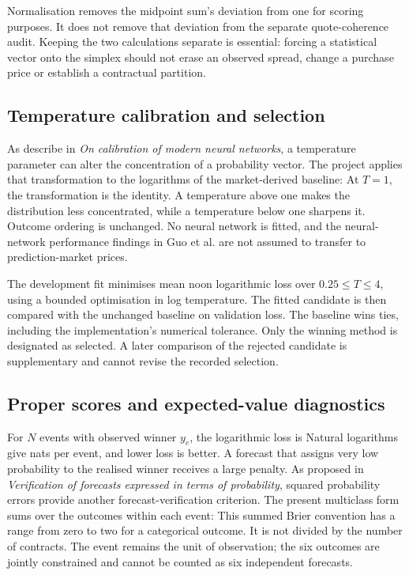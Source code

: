 Normalisation removes the midpoint sum's deviation from one for scoring purposes. It does not remove that deviation from the separate quote-coherence audit. Keeping the two calculations separate is essential: forcing a statistical vector onto the simplex should not erase an observed spread, change a purchase price or establish a contractual partition.

\subsection{Temperature calibration and selection}
As  describe in \textit{On calibration of modern neural networks}, a temperature parameter can alter the concentration of a probability vector. The project applies that transformation to the logarithms of the market-derived baseline:
At $T=1$, the transformation is the identity. A temperature above one makes the distribution less concentrated, while a temperature below one sharpens it. Outcome ordering is unchanged. No neural network is fitted, and the neural-network performance findings in Guo et al. are not assumed to transfer to prediction-market prices.

The development fit minimises mean noon logarithmic loss over $0.25\leq T\leq4$, using a bounded optimisation in log temperature. The fitted candidate is then compared with the unchanged baseline on validation loss. The baseline wins ties, including the implementation's numerical tolerance. Only the winning method is designated as selected. A later comparison of the rejected candidate is supplementary and cannot revise the recorded selection.

\needspace{145pt}\subsection{Proper scores and expected-value diagnostics}
For $N$ events with observed winner $y_e$, the logarithmic loss is
Natural logarithms give nats per event, and lower loss is better. A forecast that assigns very low probability to the realised winner receives a large penalty. As  proposed in \textit{Verification of forecasts expressed in terms of probability}, squared probability errors provide another forecast-verification criterion. The present multiclass form sums over the outcomes within each event:
This summed Brier convention has a range from zero to two for a categorical outcome. It is not divided by the number of contracts. The event remains the unit of observation; the six outcomes are jointly constrained and cannot be counted as six independent forecasts.

